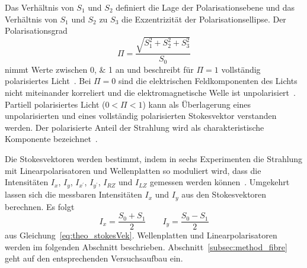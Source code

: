 \documentclass[a4paper,12pt,twoside,parskip=no,headsepline,open=right,ngerman,export]{scrreprt}
\begin{document}
            Das Verhältnis von $S_1$ und $S_2$ definiert die Lage der Polarisationsebene und das Verhältnis von $S_1$ und $S_2$ zu $S_3$ die Exzentrizität der Polarisationsellipse. Der Polarisationsgrad
            \begin{equation}
                \Pi = \frac{ \sqrt{S_1^2 + S_2^2 + S_3^2} }{S_0}
            \end{equation}
            nimmt Werte zwischen \numlist{0;1} an und beschreibt für $\Pi = 1$ vollständig polarisiertes Licht~\cite{gil_polarized_2016}. Bei $\Pi = 0$ sind die elektrischen Feldkomponenten des Lichts nicht miteinander korreliert und die elektromagnetische Welle ist unpolarisiert~\cite{gil_polarized_2016}. Partiell polarisiertes Licht ($0 < \Pi < 1$) kann als Überlagerung eines unpolarisierten und eines vollständig polarisierten Stokesvektor verstanden werden. Der polarisierte Anteil der Strahlung wird als charakteristische Komponente bezeichnet~\cite{gil_polarized_2016}.
            
            Die Stokesvektoren werden bestimmt, indem in sechs Experimenten die Strahlung mit Linearpolarisatoren und Wellenplatten so moduliert wird, dass die Intensitäten $I_x$, $I_y$, $I_{x^\prime}$, $I_{y^\prime}$, $I_{RZ}$ und $I_{LZ}$ gemessen werden können~\cite{goldstein_polarized_2011}. Umgekehrt lassen sich die messbaren Intensitäten $I_x$ und $I_y$ aus den Stokesvektoren berechnen. Es folgt
            \begin{equation}
                I_x = \frac{S_0 + S_1}{2} \qquad
                I_y = \frac{S_0 - S_1}{2}
            \end{equation}
            aus Gleichung~\ref{eq:theo_stokesVek}. Wellenplatten und Linearpolarisatoren werden im folgenden Abschnitt beschrieben. Abschnitt~\ref{subsec:method_fibre} geht auf den entsprechenden Versuchsaufbau ein.
            
\end{document}
